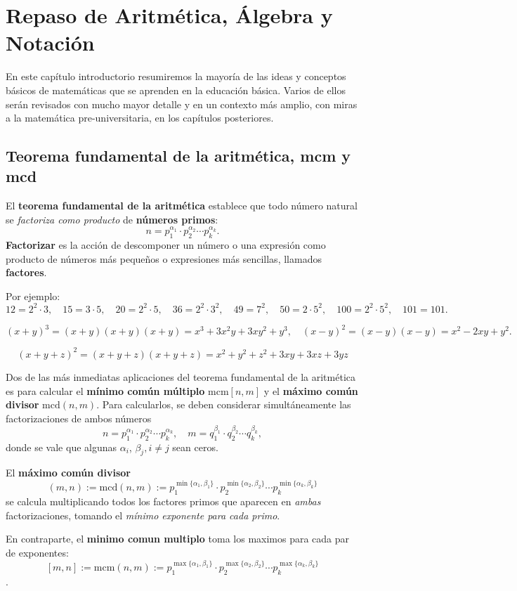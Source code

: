 \chapter{Repaso de Aritmética, Álgebra y Notación}

En este capítulo introductorio resumiremos la mayoría de las ideas y conceptos básicos de matemáticas que se aprenden en la educación básica. Varios de ellos serán revisados con mucho mayor detalle y en un contexto más amplio, con miras a la matemática pre-universitaria, en los capítulos posteriores.

\section{Teorema fundamental de la aritmética, mcm y mcd}

El {\bf teorema fundamental de la aritmética} establece que todo número natural se \emph{factoriza como producto} de {\bf números primos}: $$n=p_1^{\alpha_1}\cdot p_2^{\alpha_2}\cdots p_k^{\alpha_k}.$$
{\bf Factorizar} es la acción de descomponer un número o una expresión como producto de números más pequeños o expresiones más sencillas, llamados {\bf factores}.

Por ejemplo: 
$$12=2^2\cdot 3,\quad 15=3\cdot 5,\quad 20= 2^2\cdot 5,\quad 36=2^2\cdot 3^2, \quad 49=7^2, \quad 50=2\cdot 5^2, \quad 100=2^2\cdot 5^2, \quad 101=101.$$

$$(x+y)^3=(x+y)(x+y)(x+y)=x^3+3x^2y+3xy^2+y^3, \quad (x-y)^2 =(x-y)(x-y)=x^2-2xy+y^2.$$

$$(x+y+z)^2=(x+y+z)(x+y+z)=x^2+y^2+z^2+3xy+3xz+3yz$$

Dos de las más inmediatas aplicaciones del teorema fundamental de la aritmética es para calcular el {\bf mínimo común múltiplo} $\mathrm{mcm}[n,m]$ y el {\bf máximo común divisor} $\mathrm{mcd}(n,m)$. Para calcularlos, se deben considerar simultáneamente las factorizaciones de ambos números $$n=p_1^{\alpha_1}\cdot p_2^{\alpha_2} \cdots p_k^{\alpha_k}, \quad m=q_1^{\beta_1}\cdot q_2^{\beta_2} \cdots q_k^{\beta_k},$$
donde se vale que algunas $\alpha_i$, $\beta_j, i\neq j$ sean ceros. 

El {\bf máximo común divisor} $$(m,n):= \mathrm{mcd}(n,m):= p_1^{\min\{\alpha_1,\beta_1\}}\cdot p_2^{\min\{\alpha_2,\beta_2\}} \cdots p_k^{\min\{\alpha_k,\beta_k\}}$$ se calcula multiplicando todos los factores primos que aparecen en \emph{ambas} factorizaciones, tomando el \emph{mínimo exponente para cada primo}.

En contraparte, el {\bf minimo comun multiplo} toma los maximos para cada par de exponentes: $$[m,n]:= \mathrm{mcm}(n,m):= p_1^{\max\{\alpha_1,\beta_1\}}\cdot p_2^{\max\{\alpha_2,\beta_2\}} \cdots p_k^{\max\{\alpha_k,\beta_k\}}$$. 

